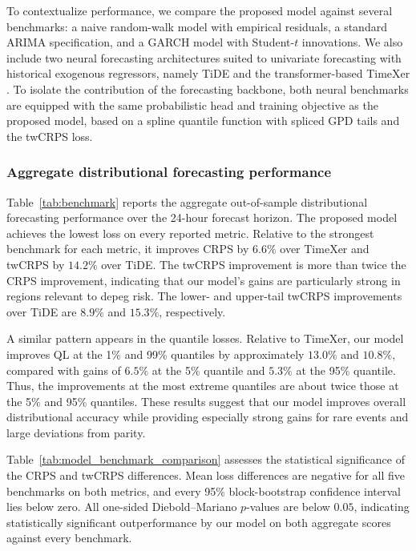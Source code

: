\documentclass[a4paper,fleqn]{cas-sc}
\begin{document}
To contextualize performance, we compare the proposed model against several benchmarks: a naive random-walk model with empirical residuals, a standard ARIMA specification, and a GARCH model with Student-$t$ innovations. We also include two neural forecasting architectures suited to univariate forecasting with historical exogenous regressors, namely TiDE \citep{TIDE} and the transformer-based TimeXer \citep{TimeXer}. To isolate the contribution of the forecasting backbone, both neural benchmarks are equipped with the same probabilistic head and training objective as the proposed model, based on a spline quantile function with spliced GPD tails and the twCRPS loss.

\subsubsection{Aggregate distributional forecasting performance}

Table~\ref{tab:benchmark} reports the aggregate out-of-sample distributional forecasting performance over the 24-hour forecast horizon. The proposed model achieves the lowest loss on every reported metric. Relative to the strongest benchmark for each metric, it improves CRPS by $6.6\%$ over TimeXer and twCRPS by $14.2\%$ over TiDE. The twCRPS improvement is more than twice the CRPS improvement, indicating that our model's gains are particularly strong in regions relevant to depeg risk. The lower- and upper-tail twCRPS improvements over TiDE are $8.9\%$ and $15.3\%$, respectively.

A similar pattern appears in the quantile losses. Relative to TimeXer, our model improves QL at the 1\% and 99\% quantiles by approximately $13.0\%$ and $10.8\%$, compared with gains of $6.5\%$ at the 5\% quantile and $5.3\%$ at the 95\% quantile. Thus, the improvements at the most extreme quantiles are about twice those at the 5\% and 95\% quantiles. These results suggest that our model improves overall distributional accuracy while providing especially strong gains for rare events and large deviations from parity.

Table~\ref{tab:model_benchmark_comparison} assesses the statistical significance of the CRPS and twCRPS differences. Mean loss differences are negative for all five benchmarks on both metrics, and every 95\% block-bootstrap confidence interval lies below zero. All one-sided Diebold--Mariano $p$-values are below $0.05$, indicating statistically significant outperformance by our model on both aggregate scores against every benchmark.
\end{document}
